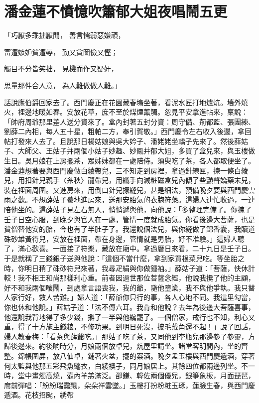 %

\chapter{潘金蓮不憤憶吹簫\KG 郁大姐夜唱鬧五更}


「巧厭多乖拙厭閒，  善言懦弱惡嫌頑，

富遭嫉妒貧遭辱，  勤又貪圖儉又慳；

觸目不分皆笑拙，  見機而作又疑奸，

思量那件合人意，  為人難做做人難。」

話說應伯爵回家去了。西門慶正在花園藏春塢坐著，看泥水匠打地爐炕。墻外燒火，裡邊地暖如春。安放花草，庶不至於煤煙薰觸。忽見平安拿進帖來，稟說：「帥府周爺那里差人送分資來了。盒內封著五封分資：周守備、荊都監、張團練、劉薛二內相，每人五十星，粗帕二方，奉引賀敬。」西門慶令左右收入後邊，拿回帖打發來人去了。且說那日楊姑娘與吳大妗子、潘姥姥坐轎子先來了。然後薛姑子、大師父、王姑子并兩個小姑子妙趣、妙鳳并郁大姐，多買了盒兒來，與玉樓做生日。吳月娘在上房擺茶，眾姊妹都在一處陪侍。須臾吃了茶，各人都取便坐了。潘金蓮想著要與西門慶做白綾帶兒，三不知走到房裡，拿過針線匣，揀一條白綾兒，用扣針兒親手〈糸秋〉龍帶兒，用纖手向減粧磁盒兒內傾了些顫聲嬌藥末兒，裝在裡面周圍。又進房來，用倒口針兒撩縫兒，甚是細法，預備晚夕要與西門慶雲雨之歡。不想薛姑子驀地進房來，送那安胎氣的衣胞符藥。這婦人連忙收過，一連陪他坐的。這薛姑子見左右無人，悄悄遞與他，向他說：「多整理完備了。你揀了壬子日空心服，到晚夕與官人在一處，管情一度就成胎氣。你看後邊大菩薩，也是貧僧替他安的胎，今也有了半肚子了。我還說個法兒，與你縫做了錦香囊，我贖道硃砂雄黃符兒，安放在裡面，帶在身邊，管情就是男胎，好不准驗。」這婦人聽了，滿心歡喜。一面接了符樂，藏放在廂中。拿過曆日來看，二十九日是壬子日。于是就稱了三錢銀子送與他說：「這個不當什麼，拿到家買根菜兒吃。等坐胎之時，你明日稍了硃砂符兒來著，我尋疋絹與你做鍾袖。」薛姑子道：「菩薩，快休計較！我不相王和尚那樣利心重。前者因過世那位菩薩念經，他說我攙了他的主顧，好不和我兩個嚷鬧，到處拿言語喪我，我的爺，隨他墮業，我不與他爭執。我只替人家行好，救人苦難。」婦人道：「薛爺你只行的事，各人心地不同。我這里勾當，你也休和他說。」薛姑子道：「法不傳六耳。我肯和他說？去年為後邊大菩薩喜事，他還說我背地得了多少錢，擗了一半與他纔罷了。一個僧家，戒行也不知，利心又重，得了十方施主錢粮，不修功果。到明日死沒，披毛戴角還不起！」說了回話，婦人教春梅：「看茶與薛爺吃。」那姑子吃了茶，又同他到李瓶兒那邊參了參靈，方歸後邊來。約後晌時分，月娘兩個放卓兒，炕屋里請坐。諸堂客明間內，坐的齊整。錦帳圍屏，放八仙卓，鋪著火盆，擺的案酒。晚夕孟玉樓與西門慶遞酒，穿著何太監與他那五彩飛魚氅衣，白綾襖子，同月娘居上。其餘四位都兩邊列坐。不一時，堂中畫燭高燒，壺內羊羔滿泛。邵鎌、韓佐兩個優兒，銀箏象板，月面琵琶，席前彈唱：「紛紛瑞靄飄，朵朵祥雲墜。」玉樓打扮粉粧玉琢，蓮臉生春，與西門慶遞酒。花枝招颭，綉帶